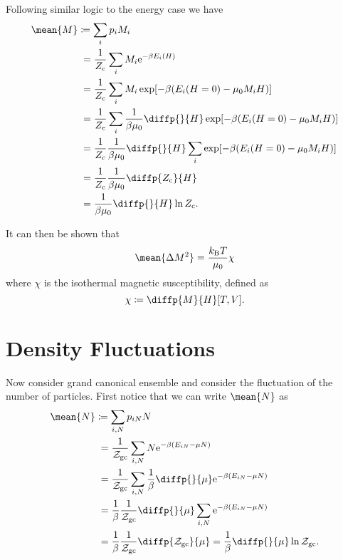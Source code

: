 \documentclass[fleqn]{NotesClass}
\newcommand*{\boltzmann}{k_{\mathrm{B}}}
\newcommand*{\cpartition}{Z_{\mathrm{c}}}
\newcommand*{\gcpartition}{\mathcal{Z}_{\mathrm{gc}}}
\newcommand*{\e}{\mathrm{e}}
\begin{document}
    Following similar logic to the energy case we have
    \begin{align}
        \mean{M} &\coloneqq \sum_i p_iM_i\\
        &\hphantom{:}= \frac{1}{\cpartition} \sum_i M_i \e^{-\beta E_i(H)}\\
        &\hphantom{:}= \frac{1}{\cpartition} \sum_i M_i \exp[-\beta(E_i(H = 0) - \mu_0 M_i H)]\\
        &\hphantom{:}= \frac{1}{\cpartition} \sum_i \frac{1}{\beta \mu_0} \diffp{}{H} \exp[-\beta(E_i(H = 0) - \mu_0 M_i H)]\\
        &\hphantom{:}= \frac{1}{\cpartition} \frac{1}{\beta \mu_0} \diffp{}{H} \sum_i \exp[-\beta(E_i(H = 0) - \mu_0 M_i H)]\\
        &\hphantom{:}= \frac{1}{\cpartition} \frac{1}{\beta \mu_0} \diffp{\cpartition}{H}\\
        &\hphantom{:}= \frac{1}{\beta \mu_0} \diffp{}{H} \ln \cpartition.
    \end{align}
    
    It can then be shown that
    \begin{equation}
        \mean{\Delta M^2} = \frac{\boltzmann T}{\mu_0} \chi
    \end{equation}
    where \(\chi\) is the isothermal magnetic susceptibility, defined as
    \begin{equation}
        \chi \coloneqq \diffp{\smash{M}}{H}[T, V].
    \end{equation}
    
    \section{Density Fluctuations}
    Now consider grand canonical ensemble and consider the fluctuation of the number of particles.
    First notice that we can write \(\mean{N}\) as
    \begin{align}
        \mean{N} &\coloneqq \sum_{i, N} p_{iN}N\\
        &\hphantom{:}= \frac{1}{\gcpartition} \sum_{i, N} N\e^{-\beta(E_{iN} - \mu N)}\\
        &\hphantom{:}= \frac{1}{\gcpartition} \sum_{i, N} \frac{1}{\beta}\diffp{}{\mu} \e^{-\beta(E_{iN} - \mu N)}\\
        &\hphantom{:}= \frac{1}{\beta} \frac{1}{\gcpartition} \diffp{}{\mu} \sum_{i, N} \e^{-\beta(E_{iN} - \mu N)}\\
        &\hphantom{:}= \frac{1}{\beta} \frac{1}{\gcpartition} \diffp{\gcpartition}{\mu} = \frac{1}{\beta} \diffp{}{\mu} \ln \gcpartition.
    \end{align}
    
\end{document}
